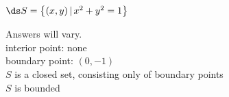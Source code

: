 {$\ds S = \left\{(x,y)\,| \,  x^2+y^2=1\right\}$}
{Answers will vary.\\
interior point: none\\
boundary point: $(0,-1)$\\
$S$ is a closed set, consisting only of boundary points\\
$S$ is bounded

}